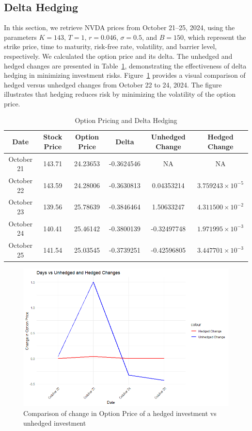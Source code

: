 \subsection{Delta Hedging}

In this section, we retrieve NVDA prices from October 21--25, 2024, using the parameters \( K = 143 \), \( T = 1 \), \( r = 0.046 \), \( \sigma = 0.5 \), and \( B = 150 \), which represent the strike price, time to maturity, risk-free rate, volatility, and barrier level, respectively. We calculated the option price and its delta. The unhedged and hedged changes are presented in Table~\ref{tab:hedging}, demonstrating the effectiveness of delta hedging in minimizing investment risks. Figure~\ref{fig:hedgingvunhedging} provides a visual comparison of hedged versus unhedged changes from October 22 to 24, 2024. The figure illustrates that hedging reduces risk by minimizing the volatility of the option price.

\begin{table}[h]
	\centering
	\caption{Option Pricing and Delta Hedging}
	\label{tab:hedging}
	\begin{tabular}{|c|c|c|c|c|c|}
		\hline
		\textbf{Date} & \textbf{Stock Price} & \textbf{Option Price} & \textbf{Delta} & \textbf{Unhedged Change} & \textbf{Hedged Change} \\
		\hline
		October 21 & 143.71 & 24.23653 & -0.3624546 & NA & NA \\
		\hline
		October 22 & 143.59 & 24.28006 & -0.3630813 & 0.04353214 & $3.759243 \times 10^{-5}$ \\
		\hline
		October 23 & 139.56 & 25.78639 & -0.3846464 & 1.50633247 & $4.311500 \times 10^{-2}$ \\
		\hline
		October 24 & 140.41 & 25.46142 & -0.3800139 & -0.32497748 & $1.971995 \times 10^{-3}$ \\
		\hline
		October 25 & 141.54 & 25.03545 & -0.3739251 & -0.42596805 & $3.447701 \times 10^{-3}$ \\
		\hline
	\end{tabular}
\end{table}

\begin{figure}[h]
	\centering
	\includegraphics[width=0.65\linewidth]{content/images/hedgedvsunhedged.png}
	\caption{Comparison of change in Option Price of a hedged investment vs unhedged investment}
	\label{fig:hedgingvunhedging}
\end{figure}

